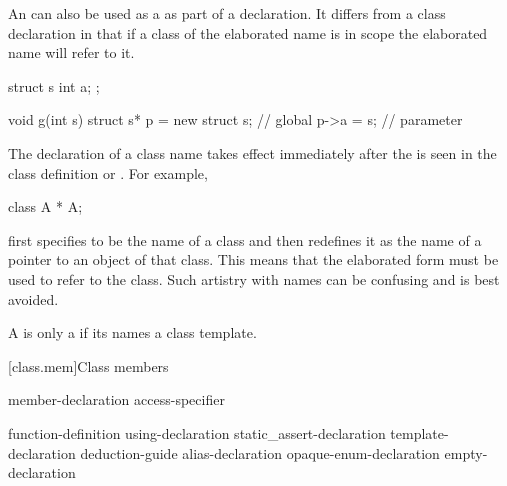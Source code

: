 \pnum
{}%
%
\begin{note}
An  can also
be used as a  as part of a declaration. It
differs from a class declaration in that if a class of the elaborated
name is in scope the elaborated name will refer to it.
\end{note}
\begin{example}

\begin{codeblock}
struct s { int a; };

void g(int s) {
  struct s* p = new struct s;   // global 
  p->a = s;                     // parameter 
}
\end{codeblock}
\end{example}

\pnum
{}%
\begin{note}
The declaration of a class name takes effect immediately after the
 is seen in the class definition or
. For example,

\begin{codeblock}
class A * A;
\end{codeblock}

first specifies  to be the name of a class and then redefines
it as the name of a pointer to an object of that class. This means that
the elaborated form   must be used to refer to the
class. Such artistry with names can be confusing and is best avoided.
\end{note}

\pnum
{}%
A  is only a 
if its  names a class template.

[class.mem]{Class members}%
%

\begin{bnf}
\br
    member-declaration \br
    access-specifier \terminal{:} 
\end{bnf}

\begin{bnf}
\br
       \terminal{;}\br
    function-definition\br
    using-declaration\br
    static_assert-declaration\br
    template-declaration\br
    deduction-guide\br
    alias-declaration\br
    opaque-enum-declaration\br
    empty-declaration
\end{bnf}

